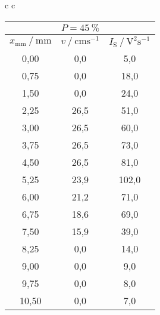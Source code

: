 \begin{table}[H]
\begin{tabular}{c c}
      \begin{tabular}{c c c} 
          \hline
          \toprule
          & $P = \qty{45}{\percent}$ & \\
          \midrule
          $x_\text{mm} \mathbin{/} \unit{\milli\meter}$ &
          $v \mathbin{/} \mathrm{cm s^{-1}}$ &
          $I_\text{S} \mathbin{/} \mathrm{V^2 s^{-1}}$ \\
          \midrule
          0,00 &  0,0 &   5,0 \\
          0,75 &  0,0 &  18,0 \\
          1,50 &  0,0 &  24,0 \\
          2,25 & 26,5 &  51,0 \\
          3,00 & 26,5 &  60,0 \\
          3,75 & 26,5 &  73,0 \\
          4,50 & 26,5 &  81,0 \\
          5,25 & 23,9 & 102,0 \\
          6,00 & 21,2 &  71,0 \\
          6,75 & 18,6 &  69,0 \\
          7,50 & 15,9 &  39,0 \\
          8,25 &  0,0 &  14,0 \\
          9,00 &  0,0 &   9,0 \\
          9,75 &  0,0 &   8,0 \\
         10,50 &  0,0 &   7,0 \\
          \bottomrule
          \hline
      \end{tabular} \\
  \end{tabular}

\end{table}

